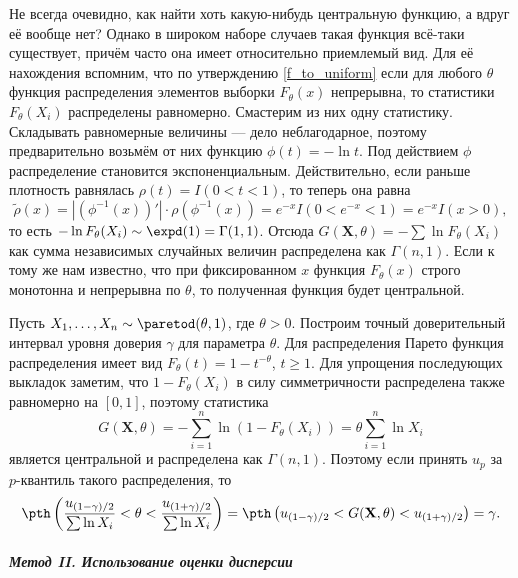 Не всегда очевидно, как найти хоть какую-нибудь центральную функцию, а вдруг её вообще нет? Однако в широком наборе случаев такая функция всё-таки существует, причём часто она имеет относительно приемлемый вид. Для её нахождения вспомним, что по утверждению \ref{f_to_uniform} если для любого $\theta$ функция распределения элементов выборки $F_{\theta}(x)$ непрерывна, то статистики $F_{\theta}(X_i)$ распределены равномерно. Смастерим из них одну статистику. Складывать равномерные величины --- дело неблагодарное, поэтому предварительно возьмём от них функцию $\phi(t) = -\ln{t}$. Под действием $\phi$ распределение становится экспоненциальным. Действительно, если раньше плотность равнялась $\rho(t) = I(0 < t < 1)$, то теперь она равна
\[
\tilde \rho(x) = |(\phi^{-1}(x))'| \cdot \rho(\phi^{-1}(x)) = e^{-x}I(0 < e^{-x} < 1) = e^{-x}I(x > 0),
\]
то есть $-\ln{F_{\theta}(X_i)} \sim \expd(1) = \Gamma(1, 1)$. Отсюда $G(\mathbf X, \theta) = - \sum \ln{F_{\theta}(X_i)}$ как сумма независимых случайных величин распределена как $\Gamma(n, 1)$. Если к тому же нам известно, что при фиксированном $x$ функция $F_{\theta}(x)$ строго монотонна и непрерывна по $\theta$, то полученная функция будет центральной.

\begin{example}
    Пусть $X_1, \ldots, X_n \sim \paretod(\theta, 1)$, где $\theta > 0$. Построим точный доверительный интервал уровня доверия $\gamma$ для параметра $\theta$. Для распределения Парето функция распределения имеет вид $F_{\theta}(t) = 1 - t^{-\theta}$, $t \ge 1$. Для упрощения последующих выкладок заметим, что $1-F_{\theta}(X_i)$ в силу симметричности распределена также равномерно на $[0, 1]$, поэтому статистика
    \[
    G(\mathbf X, \theta) = - \sum_{i=1}^n \ln{(1-F_{\theta}(X_i))} = \theta \sum_{i=1}^n \ln{X_i}
    \]
    является центральной и распределена как $\Gamma(n, 1)$. Поэтому если принять $u_p$ за $p$-квантиль такого распределения, то
    \[
    \pth\left(\frac{u_{(1-\gamma)/2}}{\sum \ln{X_i}} < \theta < \frac{u_{(1+\gamma)/2}}{\sum \ln{X_i}}\right) = \pth\left(u_{(1-\gamma)/2} < G(\mathbf X, \theta) < u_{(1+\gamma)/2} \right) = \gamma.
    \]
\end{example}

\paragraph{\textit{Метод II. Использование оценки дисперсии}}

